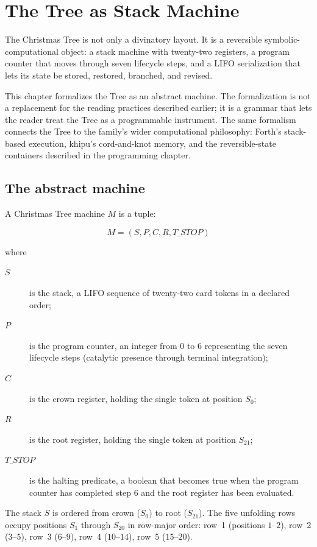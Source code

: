 \chapter{The Tree as Stack Machine}

The Christmas Tree is not only a divinatory layout. It is a reversible
symbolic-computational object: a stack machine with twenty-two registers,
a program counter that moves through seven lifecycle steps, and a LIFO
serialization that lets its state be stored, restored, branched, and revised.

This chapter formalizes the Tree as an abstract machine. The formalization is
not a replacement for the reading practices described earlier; it is a grammar
that lets the reader treat the Tree as a programmable instrument. The same
formalism connects the Tree to the family's wider computational philosophy:
Forth's stack-based execution, khipu's cord-and-knot memory, and the
reversible-state containers described in the programming chapter.

\section{The abstract machine}

A Christmas Tree machine $M$ is a tuple:

\[
M = (S, P, C, R, \mathit{T\_STOP})
\]

where

\begin{description}
\item[$S$] is the stack, a LIFO sequence of twenty-two card tokens in a declared
      order;
\item[$P$] is the program counter, an integer from $0$ to $6$ representing the
      seven lifecycle steps (catalytic presence through terminal integration);
\item[$C$] is the crown register, holding the single token at position $S_0$;
\item[$R$] is the root register, holding the single token at position $S_{21}$;
\item[$\mathit{T\_STOP}$] is the halting predicate, a boolean that becomes true
      when the program counter has completed step $6$ and the root register has
      been evaluated.
\end{description}

The stack $S$ is ordered from crown ($S_0$) to root ($S_{21}$). The five
unfolding rows occupy positions $S_1$ through $S_{20}$ in row-major order:
row~1 (positions $1$--$2$), row~2 ($3$--$5$), row~3 ($6$--$9$), row~4
($10$--$14$), row~5 ($15$--$20$).

